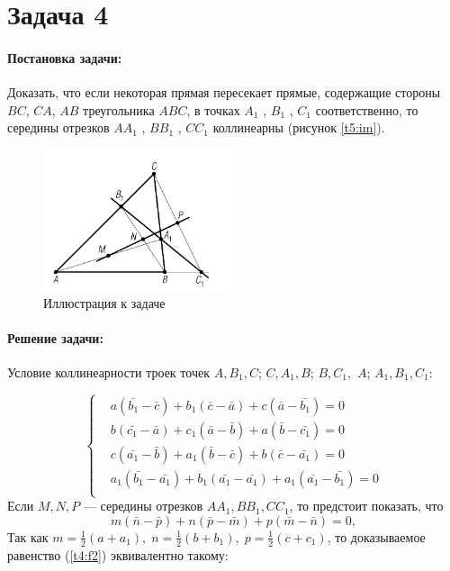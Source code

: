 {
   \section*{Задача 4}
   \paragraph{Постановка задачи:}
   Доказать, что если некоторая прямая пересекает прямые, содержащие стороны
   \(BC\), \(CA\), \(AB\) треугольника \(ABC\), в точках \(A_1\) , \(B_1\) , \(C_1\)
   соответственно, то середины отрезков \(AA_1\) , \(BB_1\) , \(CC_1\) коллинеарны (рисунок \ref{t5:im}).
   \begin{figure}[h]
      \centering
      \includegraphics[width=0.5\textwidth]{images/task4.png}
      \caption{Иллюстрация к задаче}
      \label{t4:im}
   \end{figure}
   \paragraph{Решение задачи:}
   Условие коллинеарности троек точек \(A, B_1, C\); \(C,
   A_1, B\); \(B, C_1,\) \(A\); \(A_1, B_1, C_1\):

   \begin{equation}
      \left\{ \begin{aligned}
          & a(\bar{b_1} - \bar{c}) + b_1(\bar{c} - \bar{a}) + c(\bar{a} - \bar{b_1}) = 0             \\
          & b(\bar{c_1} - \bar{a}) + c_1(\bar{a} - \bar{b}) + a(\bar{b} - \bar{c_1}) = 0             \\
          & c(\bar{a_1} - \bar{b}) + a_1(\bar{b} - \bar{c}) + b(\bar{c} - \bar{a_1}) = 0             \\
          & a_1(\bar{b_1} - \bar{a_1}) + b_1(\bar{a_1} - \bar{a_1}) + a_1(\bar{a_1} - \bar{b_1}) = 0 \\
      \end{aligned}
      \right. \label{t4:f1}
   \end{equation}
   Если \(M, N, P\) --- середины отрезков \(AA_1, BB_1, CC_1\), то предстоит показать, что
   \begin{equation}
      m(\bar{n} -\bar{p})+n(\bar{p}-\bar{m})+p(\bar{m}-\bar{n})=0,
      \label{t4:f2}
   \end{equation}
   Так как \(\displaystyle
   m=\frac{1}{2}(a+a_1),\;
   n=\frac{1}{2}(b+b_1),\;
   p=\frac{1}{2}(c+c_1)
   \), то доказываемое равенство (\ref{t4:f2}) эквивалентно такому:

}
